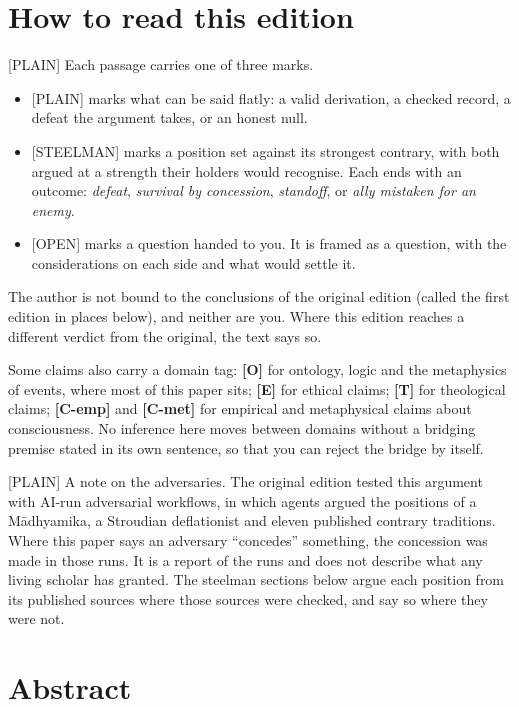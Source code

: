 \documentclass[11pt]{article}
\newcommand{\register}[1]{{\ttfamily\small #1}}
\begin{document}
\section*{How to read this edition}

\register{[PLAIN]} Each passage carries one of three marks.

\begin{itemize}
\item \register{[PLAIN]} marks what can be said flatly: a valid derivation, a checked record, a defeat the argument takes, or an honest null.
\item \register{[STEELMAN]} marks a position set against its strongest contrary, with both argued at a strength their holders would recognise. Each ends with an outcome: \emph{defeat}, \emph{survival by concession}, \emph{standoff}, or \emph{ally mistaken for an enemy}.
\item \register{[OPEN]} marks a question handed to you. It is framed as a question, with the considerations on each side and what would settle it.
\end{itemize}
The author is not bound to the conclusions of the original edition (called the first edition in places below), and neither are you. Where this edition reaches a different verdict from the original, the text says so.

Some claims also carry a domain tag: \textbf{[O]} for ontology, logic and the metaphysics of events, where most of this paper sits; \textbf{[E]} for ethical claims; \textbf{[T]} for theological claims; \textbf{[C-emp]} and \textbf{[C-met]} for empirical and metaphysical claims about consciousness. No inference here moves between domains without a bridging premise stated in its own sentence, so that you can reject the bridge by itself.

\register{[PLAIN]} A note on the adversaries. The original edition tested this argument with AI-run adversarial workflows, in which agents argued the positions of a Mādhyamika, a Stroudian deflationist and eleven published contrary traditions. Where this paper says an adversary ``concedes'' something, the concession was made in those runs. It is a report of the runs and does not describe what any living scholar has granted. The steelman sections below argue each position from its published sources where those sources were checked, and say so where they were not.

\section*{Abstract}
\end{document}
